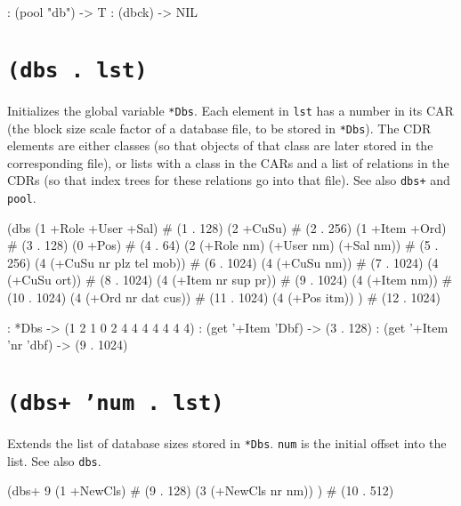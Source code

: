 {\begin{wideverbatim}
: (pool "db")
-> T
: (dbck)
-> NIL
\end{wideverbatim}

 
\section*{\texttt{(dbs . lst)}}
\label{sec:func-ref-D-(dbs . lst)}


Initializes the global variable \texttt{*Dbs}. Each element in \texttt{lst} has a
number in its CAR (the block size scale factor of a database file, to be
stored in \texttt{*Dbs}). The CDR elements are either classes (so that objects
of that class are later stored in the corresponding file), or lists with
a class in the CARs and a list of relations in the CDRs (so that index
trees for these relations go into that file). See also \texttt{dbs+} and
\texttt{pool}.


\begin{wideverbatim}
(dbs
   (1 +Role +User +Sal)                         # (1 . 128)
   (2 +CuSu)                                    # (2 . 256)
   (1 +Item +Ord)                               # (3 . 128)
   (0 +Pos)                                     # (4 . 64)
   (2 (+Role nm) (+User nm) (+Sal nm))          # (5 . 256)
   (4 (+CuSu nr plz tel mob))                   # (6 . 1024)
   (4 (+CuSu nm))                               # (7 . 1024)
   (4 (+CuSu ort))                              # (8 . 1024)
   (4 (+Item nr sup pr))                        # (9 . 1024)
   (4 (+Item nm))                               # (10 . 1024)
   (4 (+Ord nr dat cus))                        # (11 . 1024)
   (4 (+Pos itm)) )                             # (12 . 1024)

: *Dbs
-> (1 2 1 0 2 4 4 4 4 4 4 4)
: (get '+Item 'Dbf)
-> (3 . 128)
: (get '+Item 'nr 'dbf)
-> (9 . 1024)
\end{wideverbatim}

 
\section*{\texttt{(dbs+ 'num . lst)}}
\label{sec:func-ref-D-(dbs+ 'num . lst)}


Extends the list of database sizes stored in \texttt{*Dbs}. \texttt{num} is the
initial offset into the list. See also \texttt{dbs}.


\begin{wideverbatim}
(dbs+ 9
   (1 +NewCls)                                  # (9 . 128)
   (3 (+NewCls nr nm)) )                        # (10 . 512)
\end{wideverbatim}

}
